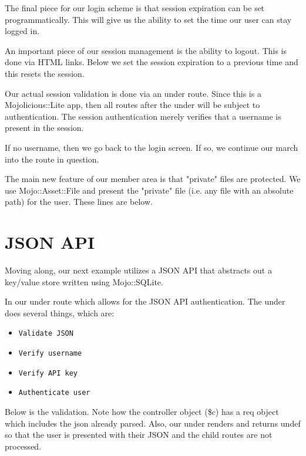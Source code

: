 \documentclass[14pt]{extreport}
\newcommand\Small{\fontsize{12}{13.0}\fontencoding{T1}\selectfont}
\newcommand*\LSTfont{\Small\ttfamily\SetTracking{encoding=*}{-60}\lsstyle}
\begin{document}
The final piece for our login scheme is that session expiration can be set
programmatically.  This will give us the ability to set the time our user can
stay logged in.

An important piece of our session management is the ability to logout.  This is
done via HTML links.  Below we set the session expiration to a previous time
and this resets the session.



Our actual session validation is done via an under route.  Since this is a
Mojolicious::Lite app, then all routes after the under will be subject to
authentication.  The session authentication merely verifies that a username is
present in the session.

If no username, then we go back to the login screen.  If so, we continue our
march into the route in question.



The main new feature of our member area is that "private" files are protected.
We use Mojo::Asset::File and present the "private" file (i.e. any file with an
absolute path) for the user.  These lines are below.



\section{JSON API}

Moving along, our next example utilizes a JSON API that abstracts out a
key/value store written using Mojo::SQLite.

In our under route which allows for the JSON API authentication.  The under
does several things, which are:

\begin{itemize} \itemsep1pt \parskip0pt 
\item \verb|Validate JSON|
\item \verb|Verify username|
\item \verb|Verify API key|
\item \verb|Authenticate user|
\end{itemize}

Below is the validation.  Note how the controller object (\$c) has a req object
which includes the json already parsed.  Also, our under renders and returns
undef so that the user is presented with their JSON and the child routes are
not processed.
\end{document}
